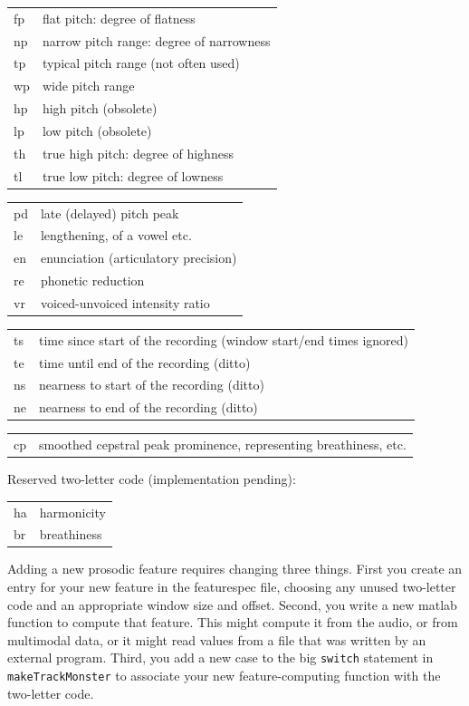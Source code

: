 \documentclass[11pt]{article}
\begin{document}
\begin{tabular}{ll}
  fp  & flat pitch: degree of flatness \\
  np  & narrow pitch range: degree of narrowness \\
  tp  & typical pitch range (not often used)\\
  wp  & wide pitch range  \\
  hp  & high pitch (obsolete) \\ 
  lp  & low pitch (obsolete) \\
  th  & true high pitch: degree of highness  \\ 
  tl  & true low pitch: degree of lowness \\
\end{tabular}

\begin{tabular}{ll}
  pd  & late (delayed) pitch peak \\
  le  & lengthening, of a vowel etc. \\
  en  & enunciation (articulatory precision) \\
  re  & phonetic reduction \\
  vr & voiced-unvoiced intensity ratio \\
\end{tabular}

\begin{tabular}{ll}
  ts  & time since start of the recording (window start/end times ignored) \\
  te  & time until end of the recording (ditto) \\
  ns  & nearness to start of the recording (ditto) \\
  ne  & nearness to end of the recording (ditto) \\
\end{tabular}

\begin{tabular}{ll}  
  cp  & smoothed cepstral peak prominence, representing breathiness, etc. \\
\end{tabular}


Reserved two-letter code (implementation pending): 

\begin{tabular}{ll}  
  ha  & harmonicity \\
  br  & breathiness
\end{tabular}

Adding a new prosodic feature requires changing three things.  First
you create an entry for your new feature in the featurespec file,
choosing any unused two-letter code and an appropriate window size and
offset.  Second, you write a new matlab function to compute that
feature.  This might compute it from the audio, or from multimodal
data, or it might read values from a file that was written by an
external program.  Third, you add a new case to the big {\tt switch}
statement in {\tt makeTrackMonster} to associate your new
feature-computing function with the two-letter code.
\end{document}
